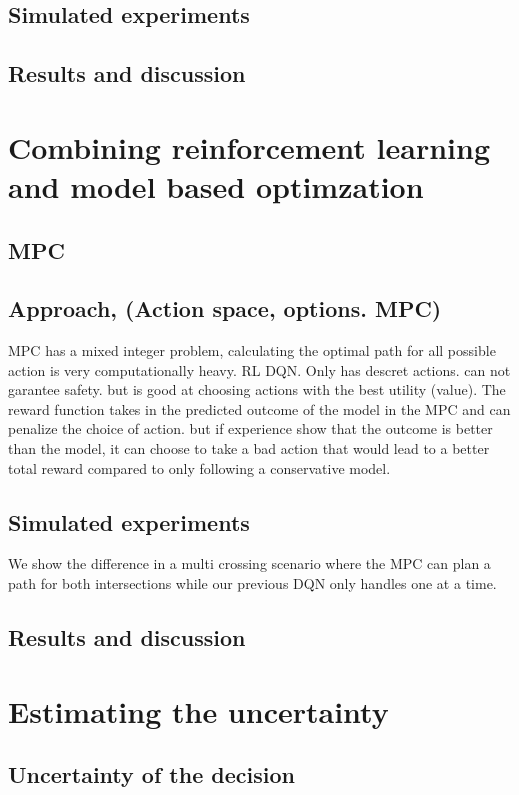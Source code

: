 \section{Simulated experiments}
\section{Results and discussion}

\chapter{Combining reinforcement learning and model based optimzation}
\section{MPC}

\section{Approach, (Action space, options. MPC)}
MPC has a mixed integer problem, calculating the optimal path for all possible action is very computationally heavy. 
RL DQN. Only has descret actions. can not garantee safety. but is good at choosing actions with the best utility (value). 
The reward function takes in the predicted outcome of the model in the MPC and can penalize the choice of action. but if experience show that the outcome is better than the model, it can choose to take a bad action that would lead to a better total reward compared to only following a conservative model. 


\section{Simulated experiments}
We show the difference in a multi crossing scenario where the MPC can plan a path for both intersections while our previous DQN only handles one at a time. 

\section{Results and discussion}

\chapter{Estimating the uncertainty}

\section{Uncertainty of the decision}

